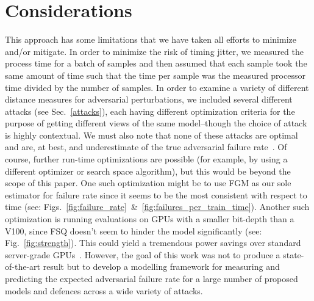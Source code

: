 \section{Considerations}
This approach has some limitations that we have taken all efforts to minimize and/or mitigate. In order to minimize the risk of timing jitter, we measured the process time for a batch of samples and then assumed that each sample took the same amount of time such that the time per sample was the measured processor time divided by the number of samples. In order to examine a variety of different distance measures for adversarial perturbations, we included several different attacks (see Sec.~\ref{attacks}), each having different optimization criteria for the purpose of getting different views of the same model--though the choice of attack is highly contextual. We must also note that none of these attacks are optimal and are, at best, and underestimate of the true adversarial failure rate~\citep{meyers}. Of course, further run-time optimizations are possible (for example, by using a different optimizer or search space algorithm), but this would be beyond the scope of this paper. 
One such optimization might be to use FGM as our sole estimator for failure rate since it seems to be the most consistent with respect to time (see: Figs.~\ref{fig:failure_rate}~\&~\ref{fig:failures_per_train_time}).
Another such optimization is running evaluations on GPUs with a smaller bit-depth than a V100, since FSQ doesn't seem to hinder the model significantly (see: Fig.~\ref{fig:strength}). This could yield a tremendous power savings over standard server-grade GPUs~\citep{chou2023applicability}.
However, the goal of this work was not to produce a state-of-the-art result but to develop a modelling framework for measuring and predicting the expected adversarial failure rate for a large number of proposed models and defences across a wide variety of attacks.

